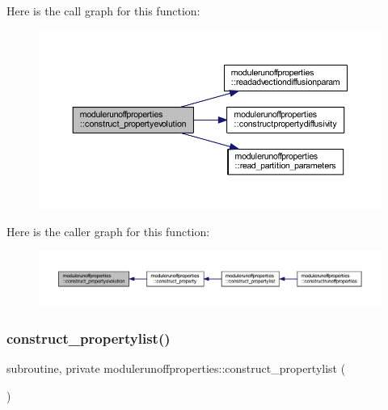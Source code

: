 Here is the call graph for this function\+:\nopagebreak
\begin{figure}[H]
\begin{center}
\leavevmode
\includegraphics[width=350pt]{namespacemodulerunoffproperties_aa934a2b16151c8ba36343b555f143da8_cgraph}
\end{center}
\end{figure}
Here is the caller graph for this function\+:\nopagebreak
\begin{figure}[H]
\begin{center}
\leavevmode
\includegraphics[width=350pt]{namespacemodulerunoffproperties_aa934a2b16151c8ba36343b555f143da8_icgraph}
\end{center}
\end{figure}
\mbox{\label{namespacemodulerunoffproperties_a442b6b1a6a4cd7b5b27b0fe8c4191f4e}} 
\subsubsection{\texorpdfstring{construct\+\_\+propertylist()}{construct\_propertylist()}}
{\footnotesize\ttfamily subroutine, private modulerunoffproperties\+::construct\+\_\+propertylist (\begin{DoxyParamCaption}{ }\end{DoxyParamCaption})\hspace{0.3cm}{\ttfamily [private]}}

